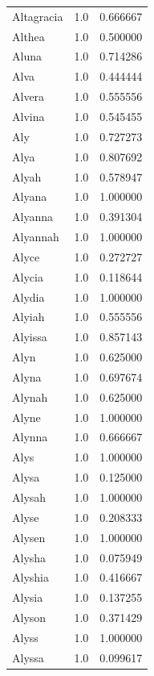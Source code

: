\documentclass[
  letterpaper,
  DIV=11,
  numbers=noendperiod]{scrreprt}
\begin{document}
\begin{tabular}{lrr}
Altagracia      &   1.0 &   0.666667 \\
Althea          &   1.0 &   0.500000 \\
Aluna           &   1.0 &   0.714286 \\
Alva            &   1.0 &   0.444444 \\
Alvera          &   1.0 &   0.555556 \\
Alvina          &   1.0 &   0.545455 \\
Aly             &   1.0 &   0.727273 \\
Alya            &   1.0 &   0.807692 \\
Alyah           &   1.0 &   0.578947 \\
Alyana          &   1.0 &   1.000000 \\
Alyanna         &   1.0 &   0.391304 \\
Alyannah        &   1.0 &   1.000000 \\
Alyce           &   1.0 &   0.272727 \\
Alycia          &   1.0 &   0.118644 \\
Alydia          &   1.0 &   1.000000 \\
Alyiah          &   1.0 &   0.555556 \\
Alyissa         &   1.0 &   0.857143 \\
Alyn            &   1.0 &   0.625000 \\
Alyna           &   1.0 &   0.697674 \\
Alynah          &   1.0 &   0.625000 \\
Alyne           &   1.0 &   1.000000 \\
Alynna          &   1.0 &   0.666667 \\
Alys            &   1.0 &   1.000000 \\
Alysa           &   1.0 &   0.125000 \\
Alysah          &   1.0 &   1.000000 \\
Alyse           &   1.0 &   0.208333 \\
Alysen          &   1.0 &   1.000000 \\
Alysha          &   1.0 &   0.075949 \\
Alyshia         &   1.0 &   0.416667 \\
Alysia          &   1.0 &   0.137255 \\
Alyson          &   1.0 &   0.371429 \\
Alyss           &   1.0 &   1.000000 \\
Alyssa          &   1.0 &   0.099617 \\

\end{tabular}
\end{document}
